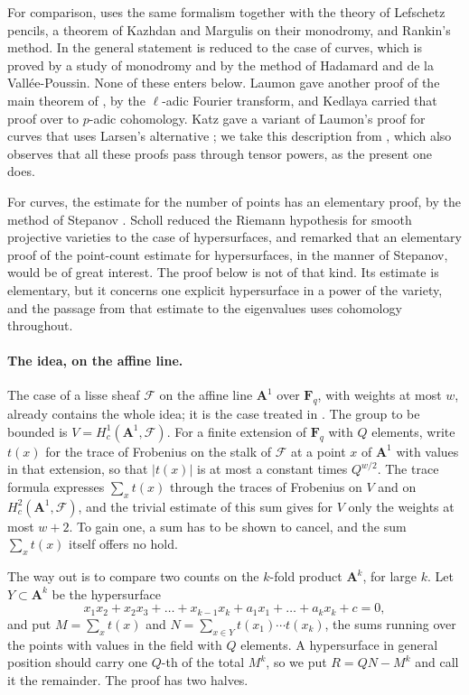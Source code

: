 \documentclass[11pt,a4paper]{article}
\theoremstyle{plain}
\theoremstyle{remark}
\newcommand{\Fq}{\mathbf F_q}
\newcommand{\A}{\mathbf A}
\newcommand{\F}{\mathcal F}
\begin{document}
For comparison, \cite{WeilI} uses the same formalism together with the theory of Lefschetz pencils, a theorem of
Kazhdan and Margulis on their monodromy, and Rankin's method. In \cite{WeilII} the general statement is reduced to
the case of curves, which is proved by a study of monodromy and by the method of Hadamard and de la
Vall\'ee-Poussin. None of these enters below. Laumon \cite{Laumon} gave another proof of the main theorem of
\cite{WeilII}, by the $\ell$-adic Fourier transform, and Kedlaya \cite{Kedlaya} carried that proof over to $p$-adic
cohomology. Katz gave a variant of Laumon's proof for curves that uses Larsen's alternative \cite{KatzLectures}; we
take this description from \cite[Remark 1.4]{Zhang}, which also observes that all these proofs pass through tensor
powers, as the present one does.

For curves, the estimate for the number of points has an elementary proof, by the method of Stepanov
\cite{Bombieri}. Scholl \cite{Scholl} reduced the Riemann hypothesis for smooth projective varieties to the case of
hypersurfaces, and remarked that an elementary proof of the point-count estimate for hypersurfaces, in the manner of
Stepanov, would be of great interest. The proof below is not of that kind. Its estimate is elementary, but it
concerns one explicit hypersurface in a power of the variety, and the passage from that estimate to the eigenvalues
uses cohomology throughout.

\paragraph{The idea, on the affine line.}
The case of a lisse sheaf $\F$ on the affine line $\A^1$ over $\Fq$, with weights at most $w$, already contains the
whole idea; it is the case treated in \cite{Zhang}. The group to be bounded is $V=H^1_c(\A^1,\F)$. For a finite
extension of $\Fq$ with $Q$ elements, write $t(x)$ for the trace of Frobenius on the stalk of $\F$ at a point $x$
of $\A^1$ with values in that extension, so that $|t(x)|$ is at most a constant times $Q^{w/2}$. The trace formula
expresses $\sum_xt(x)$ through the traces of Frobenius on $V$ and on $H^2_c(\A^1,\F)$, and the trivial estimate of
this sum gives for $V$ only the weights at most $w+2$. To gain one, a sum has to be shown to cancel, and the sum
$\sum_xt(x)$ itself offers no hold.

The way out is to compare two counts on the $k$-fold product $\A^k$, for large $k$. Let $Y\subset\A^k$ be the
hypersurface
\[
x_1x_2+x_2x_3+\dots+x_{k-1}x_k+a_1x_1+\dots+a_kx_k+c=0,
\]
and put $M=\sum_xt(x)$ and $N=\sum_{x\in Y}t(x_1)\cdots t(x_k)$, the sums running over the points with values in
the field with $Q$ elements. A hypersurface in general position should carry one $Q$-th of the total $M^k$, so we
put $R=QN-M^k$ and call it the remainder. The proof has two halves.
\end{document}
